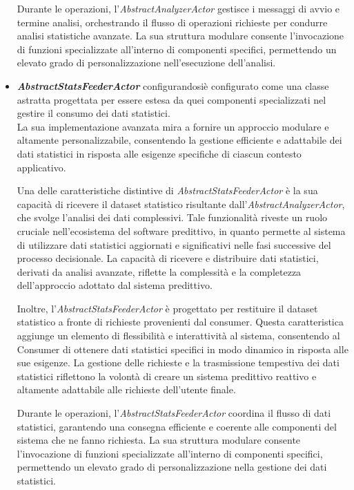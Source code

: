 \begin{itemize}
    Durante le operazioni, l'\textit{AbstractAnalyzerActor} gestisce i messaggi di avvio e termine analisi, orchestrando il flusso di operazioni richieste per condurre analisi statistiche avanzate.
    La sua struttura modulare consente l'invocazione di funzioni specializzate all'interno di componenti specifici, permettendo un elevato grado di personalizzazione nell'esecuzione dell'analisi.
    \item \textit{\textbf{AbstractStatsFeederActor}} configurandosiè configurato come una classe astratta progettata per essere estesa da quei componenti specializzati nel gestire il consumo dei dati statistici. \\
    La sua implementazione avanzata mira a fornire un approccio modulare e altamente personalizzabile, consentendo la gestione efficiente e adattabile dei dati statistici in risposta alle esigenze specifiche di ciascun contesto applicativo.

    Una delle caratteristiche distintive di \textit{AbstractStatsFeederActor} è la sua capacità di ricevere il dataset statistico risultante dall'\textit{AbstractAnalyzerActor}, che svolge l'analisi dei dati complessivi.
    Tale funzionalità riveste un ruolo cruciale nell'ecosistema del software predittivo, in quanto permette al sistema di utilizzare dati statistici aggiornati e significativi nelle fasi successive del processo decisionale.
    La capacità di ricevere e distribuire dati statistici, derivati da analisi avanzate, riflette la complessità e la completezza dell'approccio adottato dal sistema predittivo.
    
    Inoltre, l'\textit{AbstractStatsFeederActor} è progettato per restituire il dataset statistico a fronte di richieste provenienti dal consumer.
    Questa caratteristica aggiunge un elemento di flessibilità e interattività al sistema, consentendo al Consumer di ottenere dati statistici specifici in modo dinamico in risposta alle sue esigenze.
    La gestione delle richieste e la trasmissione tempestiva dei dati statistici riflettono la volontà di creare un sistema predittivo reattivo e altamente adattabile alle richieste dell'utente finale.
    
    Durante le operazioni, l'\textit{AbstractStatsFeederActor} coordina il flusso di dati statistici, garantendo una consegna efficiente e coerente alle componenti del sistema che ne fanno richiesta.
    La sua struttura modulare consente l'invocazione di funzioni specializzate all'interno di componenti specifici, permettendo un elevato grado di personalizzazione nella gestione dei dati statistici.
\end{itemize}

